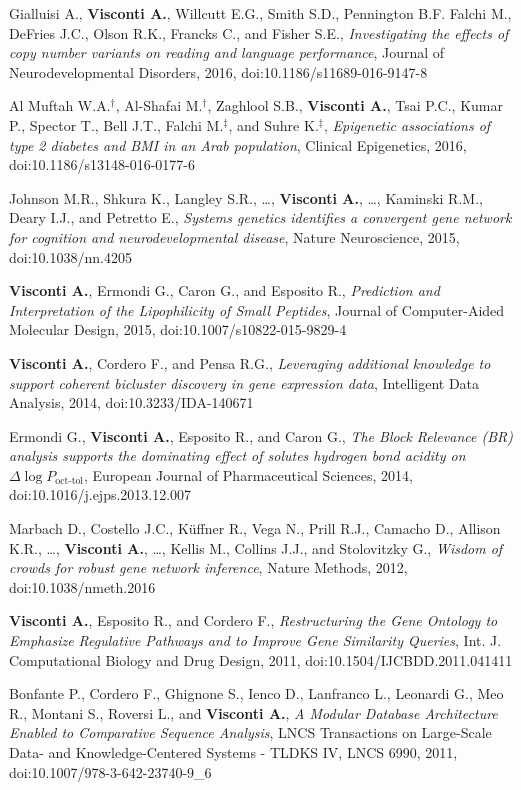 \documentclass[a4paper,10pt]{article}
\begin{document}
{\begin{itemize}
		 Gialluisi A., \textbf{Visconti A.}, Willcutt E.G., Smith S.D., Pennington B.F. Falchi M., DeFries J.C.,  Olson R.K., Francks C., and Fisher S.E., \emph{Investigating the effects of copy number variants on reading and language performance}, Journal of Neurodevelopmental Disorders, 2016, doi:10.1186/s11689-016-9147-8

		 Al Muftah W.A.$^{\textbf{$\dag $}}$, Al-Shafai M.$^{\textbf{$\dag $}}$, Zaghlool S.B., \textbf{Visconti A.}, Tsai P.C., Kumar P., Spector T., Bell J.T., Falchi M.$^{\textbf{$\ddag $}}$, and Suhre K.$^{\textbf{$\ddag $}}$, \emph{Epigenetic associations of type 2 diabetes and BMI in an Arab population}, Clinical Epigenetics, 2016, doi:10.1186/s13148-016-0177-6

		 Johnson M.R., Shkura K., Langley S.R., \dots, \textbf{Visconti A.}, \dots, Kaminski R.M., Deary I.J., and Petretto E., \emph{Systems genetics identifies a convergent gene network for cognition and neurodevelopmental disease}, Nature Neuroscience, 2015, doi:10.1038/nn.4205

		 \textbf{Visconti A.}, Ermondi G., Caron G., and Esposito R., \emph{Prediction and Interpretation of the Lipophilicity of Small Peptides}, Journal of Computer-Aided Molecular Design, 2015, doi:10.1007/s10822-015-9829-4

		 \textbf{Visconti A.}, Cordero F., and Pensa R.G., \emph{Leveraging additional knowledge to support coherent bicluster discovery in gene expression data}, Intelligent Data Analysis, 2014, doi:10.3233/IDA-140671

		 Ermondi G., \textbf{Visconti A.}, Esposito R., and Caron G., \emph{The Block Relevance (BR) analysis supports the dominating effect of solutes hydrogen bond acidity on $\Delta \log P_{\text{oct-tol}}$}, European Journal of Pharmaceutical Sciences, 2014, doi:10.1016/j.ejps.2013.12.007

		 Marbach D., Costello J.C., K\"{u}ffner R., Vega N., Prill R.J., Camacho D., Allison K.R., \dots, \textbf{Visconti A.}, \dots, Kellis M., Collins J.J., and Stolovitzky G., \emph{Wisdom of crowds for robust gene network inference}, Nature Methods, 2012, doi:10.1038/nmeth.2016

		 \textbf{Visconti A.}, Esposito R., and Cordero F., \emph{Restructuring the Gene Ontology to Emphasize Regulative Pathways and to Improve Gene Similarity Queries}, Int. J. Computational Biology and Drug Design, 2011, doi:10.1504/IJCBDD.2011.041411

		 Bonfante P., Cordero F., Ghignone S., Ienco D., Lanfranco L., Leonardi G., Meo R., Montani S., Roversi L., and \textbf{Visconti A.}, \emph{A Modular Database Architecture Enabled to Comparative Sequence Analysis}, LNCS Transactions on Large-Scale Data- and Knowledge-Centered Systems - TLDKS IV, LNCS 6990, 2011, doi:10.1007/978-3-642-23740-9\_6
 	\end{itemize}
}
\end{document}

